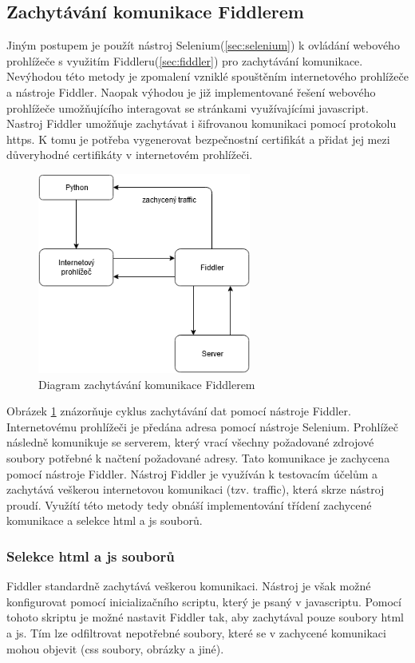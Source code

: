 \documentclass[thesis=M,czech,hidelinks]{FITthesis}[2013/05/06]
\begin{document}
\subsection{Zachytávání komunikace Fiddlerem}
Jiným postupem je použít nástroj Selenium(\ref{sec:selenium}) k ovládání webového prohlížeče s využitím Fiddleru(\ref{sec:fiddler}) pro zachytávání komunikace. Nevýhodou této metody je zpomalení vzniklé spouštěním internetového prohlížeče a nástroje Fiddler. Naopak výhodou je již implementované řešení webového prohlížeče umožňujícího interagovat se stránkami využívajícími javascript. Nastroj Fiddler umožňuje zachytávat i šifrovanou komunikaci pomocí protokolu https. K tomu je potřeba vygenerovat bezpečnostní certifikát a přidat jej mezi důveryhodné certifikáty v internetovém prohlížeči.

\begin{figure}[h]
	\centering
	\includegraphics[width=7cm]{pictures/fiddler_diagram.png}
	\caption{Diagram zachytávání komunikace Fiddlerem}
	\label{fig:fiddler}
\end{figure}

Obrázek \ref{fig:fiddler} znázorňuje cyklus zachytávání dat pomocí nástroje Fiddler. Internetovému prohlížeči je předána adresa pomocí nástroje Selenium. Prohlížeč následně komunikuje se serverem, který vrací všechny požadované zdrojové soubory potřebné k načtení požadované adresy. Tato komunikace je zachycena pomocí nástroje Fiddler. Nástroj Fiddler je využíván k testovacím účelům a zachytává veškerou internetovou komunikaci (tzv. traffic), která skrze nástroj proudí. Využítí této metody tedy obnáší implementování třídení zachycené komunikace a selekce html a js souborů.

\subsubsection{Selekce html a js souborů}
Fiddler standardně zachytává veškerou komunikaci. Nástroj je však možné konfigurovat pomocí inicializačního scriptu, který je psaný v javascriptu. Pomocí tohoto skriptu je možné nastavit Fiddler tak, aby zachytával pouze soubory html a js. Tím lze odfiltrovat nepotřebné soubory, které se v zachycené komunikaci mohou objevit (css soubory, obrázky a jiné).
\end{document}
